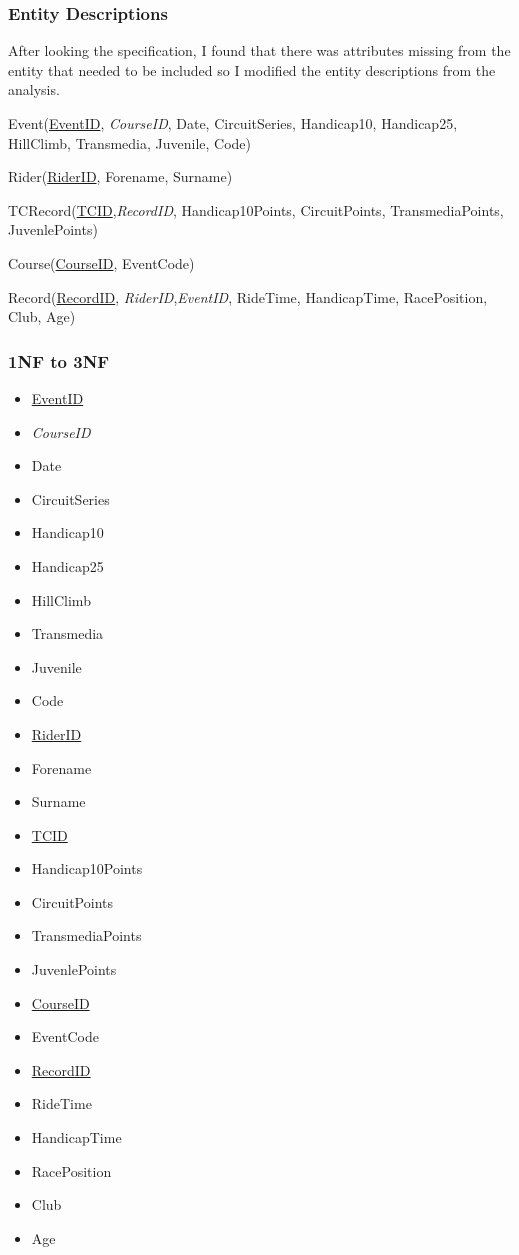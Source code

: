 \subsubsection{Entity Descriptions}
After looking the specification, I found that there was attributes missing from the entity that needed to be included so I modified the entity descriptions from the analysis.

Event(\underline{EventID}, \emph{CourseID}, Date, CircuitSeries, Handicap10, Handicap25, HillClimb, Transmedia, Juvenile, Code)

Rider(\underline{RiderID}, Forename, Surname)

TCRecord(\underline{TCID},\emph{RecordID}, Handicap10Points, CircuitPoints, TransmediaPoints, JuvenlePoints)

Course(\underline{CourseID}, EventCode)

Record(\underline{RecordID}, \emph{RiderID},\emph{EventID}, RideTime, HandicapTime, RacePosition, Club, Age)

\subsubsection{1NF to 3NF}


\begin{itemize}
\item \underline{EventID}
\item \emph{CourseID}
\item Date
\item CircuitSeries
\item Handicap10
\item Handicap25
\item HillClimb
\item Transmedia
\item Juvenile
\item Code
\item \underline{RiderID}
\item Forename
\item Surname
\item \underline{TCID}
\item Handicap10Points
\item CircuitPoints
\item TransmediaPoints
\item JuvenlePoints
\item \underline{CourseID}
\item EventCode
\item \underline{RecordID}
\item RideTime
\item HandicapTime
\item RacePosition
\item Club
\item Age
\end{itemize}

